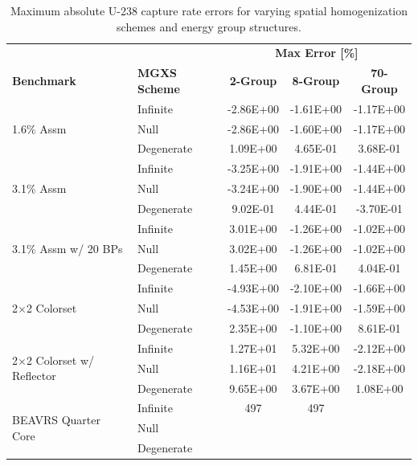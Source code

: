 \begin{table}[h!]
  \centering
  \caption[Maximum OpenMOC U-238 capture rate errors]{Maximum absolute U-238 capture rate errors for varying spatial homogenization schemes and energy group structures.}
  \small
  \label{table:chap8-openmoc-max-capt-rates}
  \vspace{6pt}
  \begin{tabular}{l l c c c}
  \toprule
  \rowcolor{lightgray}
  & & \multicolumn{3}{c}{\cellcolor{lightgray} \textbf{Max Error [\%]}} \\
  \multirow{-2}{*}{\cellcolor{lightgray} \bf Benchmark} &
  \multirow{-2}{*}{\cellcolor{lightgray} \bf \ac{MGXS} Scheme} &
  \multicolumn{1}{c}{{\cellcolor{lightgray} \bf 2-Group}} &
  \multicolumn{1}{c}{{\cellcolor{lightgray} \bf 8-Group}} &
  \multicolumn{1}{c}{{\cellcolor{lightgray} \bf 70-Group}} \\
  \midrule
\multirow{3}{*}{\parbox{2.5cm}{1.6\% Assm}} & Infinite & -2.86E+00 & -1.61E+00 & -1.17E+00 \\
& Null & -2.86E+00 & -1.60E+00 & -1.17E+00 \\
& Degenerate & 1.09E+00 & 4.65E-01 & 3.68E-01 \\
  \midrule
\multirow{3}{*}{\parbox{2.5cm}{3.1\% Assm}} & Infinite & -3.25E+00 & -1.91E+00 & -1.44E+00 \\
& Null & -3.24E+00 & -1.90E+00 & -1.44E+00 \\
& Degenerate & 9.02E-01 & 4.44E-01 & -3.70E-01 \\
  \midrule
\multirow{3}{*}{\parbox{2.5cm}{3.1\% Assm w/ 20 BPs}} & Infinite & 3.01E+00 & -1.26E+00 & -1.02E+00 \\
& Null & 3.02E+00 & -1.26E+00 & -1.02E+00 \\
& Degenerate & 1.45E+00 & 6.81E-01 & 4.04E-01 \\
  \midrule
\multirow{3}{*}{\parbox{2.5cm}{2$\times$2 Colorset}} & Infinite & -4.93E+00 & -2.10E+00 & -1.66E+00 \\
& Null & -4.53E+00 & -1.91E+00 & -1.59E+00 \\
& Degenerate & 2.35E+00 & -1.10E+00 & 8.61E-01 \\
  \midrule
\multirow{3}{*}{\parbox{2.5cm}{2$\times$2 Colorset w/ Reflector}} & Infinite & 1.27E+01 & 5.32E+00 & -2.12E+00 \\
& Null & 1.16E+01 & 4.21E+00 & -2.18E+00 \\
& Degenerate & 9.65E+00 & 3.67E+00 & 1.08E+00 \\
  \midrule
  \multirow{3}{*}{\parbox{2cm}{\ac{BEAVRS} Quarter Core}} & Infinite & 497 & 497 & \\
  & Null & & & \\
  & Degenerate & & & \\
  \bottomrule
\end{tabular}
\end{table}

